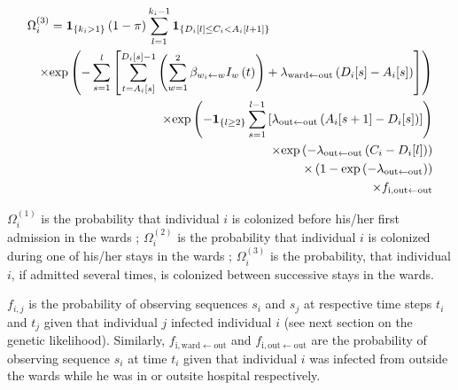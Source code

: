 \documentclass[10pt]{article}
\begin{document}
\begin{eqnarray*}
\lefteqn{\Omega_i^{\left(3\right)}  = \mathbf{1}_{\left\lbrace k_i > 1 \right\rbrace} \left( 1-\pi \right) \sum_{l=1}^{k_i-1} \mathbf{1}_{\left\lbrace D_i[l] \leq C_i < A_i[l+1] \right\rbrace}}\\
	 && \times \text{exp}\left( - \sum_{s=1}^{l} \left[ \sum_{t=A_i[s]}^{D_i[s]-1} \left( \sum_{w=1}^{2} \beta_{w_i \leftarrow w} I_w\left(t\right) \right) + \lambda_{\text{ward} \leftarrow \text{out}}\left(D_i[s]-A_i[s]\right) \right] \right) \\
	 && \times \text{exp}\left( - \mathbf{1}_{\left\lbrace l \geq 2 \right\rbrace} \sum_{s=1}^{l-1} \left[ \lambda_{\text{out} \leftarrow \text{out}}\left(A_i[s+1]-D_i[s]\right) \right] \right) \\
	 && \times \text{exp}\left( - \lambda_{\text{out} \leftarrow \text{out}}\left(C_i-D_i[l]\right) \right) \\
	 && \times \left( 1 - \text{exp}\left( - \lambda_{\text{out} \leftarrow \text{out}} \right) \right) \\
	 && \times f_{\text{i},\text{out} \leftarrow \text{out}}  \\
\end{eqnarray*}
\bigskip

$\Omega_i^{\left(1\right)}$ is the probability that individual $i$ is colonized before his/her first admission in the wards ; $\Omega_i^{\left(2\right)}$ is the probability that individual $i$ is colonized during one of his/her stays in the wards ; $\Omega_i^{\left(3\right)}$ is the probability, that individual $i$, if admitted several times, is colonized between successive stays in the wards.

$f_{i,j}$ is the probability of observing sequences $s_i$ and $s_j$ at respective time steps $t_i$ and $t_j$ given that individual $j$ infected individual $i$ (see next section on the genetic likelihood). Similarly, $f_{\text{i},\text{ward} \leftarrow \text{out}}$ and $f_{\text{i},\text{out} \leftarrow \text{out}}$ are the probability of observing sequence $s_i$ at time $t_i$ given that individual $i$ was infected from outside the wards while he was in or outsite hospital respectively. 
\end{document}
